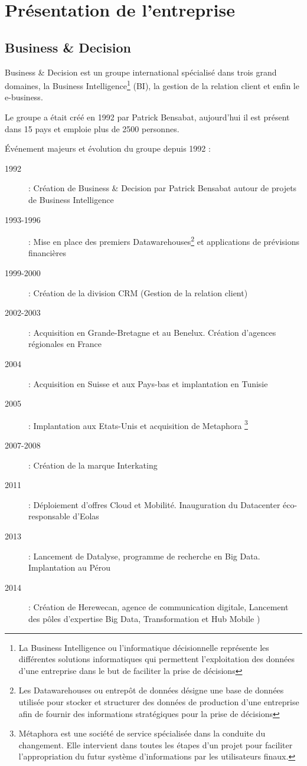\chapter{Présentation de l'entreprise}
\section{Business \& Decision}

        Business \& Decision est un groupe international spécialisé dans trois grand domaines, la Business Intelligence\footnote{La Business Intelligence ou l'informatique décisionnelle représente les différentes solutions informatiques qui permettent l'exploitation des données d'une entreprise dans le but de faciliter la prise de décisions} (BI), la gestion de la relation client et enfin le e-business. 

        Le groupe a était créé en 1992 par Patrick Bensabat, aujourd'hui il est présent dans 15 pays et emploie plus de 2500 personnes.

       	  Événement majeurs et évolution du groupe depuis 1992 : 

       	  \begin{description}
       	  \item[1992] : Création de Business \& Decision par Patrick Bensabat autour de projets de Business Intelligence
       	  \item[1993-1996] : Mise en place des premiers Datawarehouses\footnote{Les Datawarehouses ou entrepôt de données désigne une base de données utilisée pour stocker et structurer des données de production d'une entreprise afin de fournir des informations stratégiques pour la prise de décisions} et applications de prévisions financières
       	  \item[1999-2000] : Création de la division CRM (Gestion de la relation client)
       	  \item[2002-2003] : Acquisition en Grande-Bretagne et au Benelux. Création d'agences régionales en France
       	  \item[2004] : Acquisition en Suisse et aux Pays-bas et implantation en Tunisie
       	  \item[2005] : Implantation aux Etats-Unis et acquisition de Metaphora \footnote{Métaphora est une société de service spécialisée dans la conduite du changement. Elle intervient dans toutes les étapes d’un projet pour faciliter l'appropriation du futur système d’informations par les utilisateurs finaux.}
       	  \item[2007-2008] : Création de la marque Interkating
       	  \item[2011] : Déploiement d'offres Cloud et Mobilité. Inauguration du Datacenter éco-responsable d'Eolas
       	  \item[2013] : Lancement de Datalyse, programme de recherche en Big Data. Implantation au Pérou
       	  \item[2014] : Création de Herewecan, agence de communication digitale, Lancement des pôles d'expertise Big Data, Transformation et Hub Mobile )
       	  \end{description}
       	  
